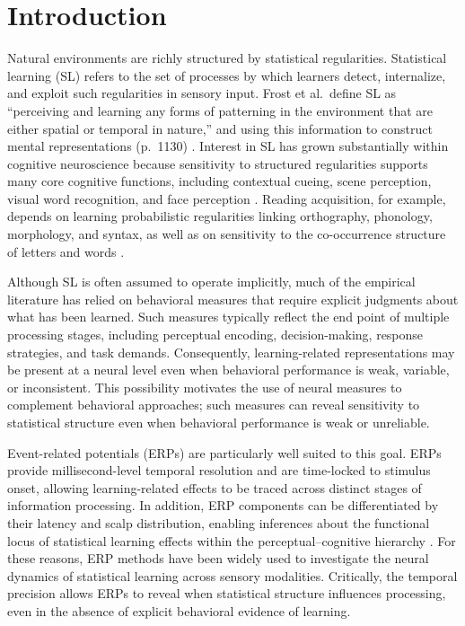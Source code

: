 \section*{Introduction}

Natural environments are richly structured by statistical regularities. Statistical learning (SL) refers to the set of processes by which learners detect, internalize, and exploit such regularities in sensory input. Frost et al.\ define SL as “perceiving and learning any forms of patterning in the environment that are either spatial or temporal in nature,” and using this information to construct mental representations (p.~1130) \cite{frostStatisticalLearningResearch2019}. Interest in SL has grown substantially within cognitive neuroscience because sensitivity to structured regularities supports many core cognitive functions, including contextual cueing, scene perception, visual word recognition, and face perception \cite{cleeremansImplicitLearningNews1998, frostStatisticalLearningResearch2019, daltrozzoNeurocognitiveMechanismsStatisticalsequential2014, shermanPrevalenceImportanceStatistical2020}. Reading acquisition, for example, depends on learning probabilistic regularities linking orthography, phonology, morphology, and syntax, as well as on sensitivity to the co-occurrence structure of letters and words \cite{frostStatisticalLearningResearch2019}.

Although SL is often assumed to operate implicitly, much of the empirical literature has relied on behavioral measures that require explicit judgments about what has been learned. Such measures typically reflect the end point of multiple processing stages, including perceptual encoding, decision-making, response strategies, and task demands. Consequently, learning-related representations may be present at a neural level even when behavioral performance is weak, variable, or inconsistent. This possibility motivates the use of neural measures to complement behavioral approaches; such measures can reveal sensitivity to statistical structure even when behavioral performance is weak or unreliable.

Event-related potentials (ERPs) are particularly well suited to this goal. ERPs provide millisecond-level temporal resolution and are time-locked to stimulus onset, allowing learning-related effects to be traced across distinct stages of information processing. In addition, ERP components can be differentiated by their latency and scalp distribution, enabling inferences about the functional locus of statistical learning effects within the perceptual–cognitive hierarchy \cite{curranBrainPotentialsRecollection2000}. For these reasons, ERP methods have been widely used to investigate the neural dynamics of statistical learning across sensory modalities. Critically, the temporal precision allows ERPs to reveal when statistical structure influences processing, even in the absence of explicit behavioral evidence of learning.


